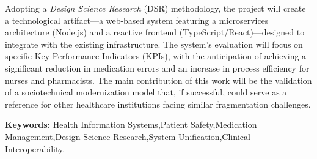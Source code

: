 Adopting a \textit{Design Science Research} (DSR) methodology, the project will create a technological artifact---a web-based system featuring a microservices architecture (Node.js) and a reactive frontend (TypeScript/\-React)---designed to integrate with the existing infrastructure. The system's evaluation will focus on specific Key Performance Indicators (KPIs), with the anticipation of achieving a significant reduction in medication errors and an increase in process efficiency for nurses and pharmacists. The main contribution of this work will be the validation of a socio\-technical modernization model that, if successful, could serve as a reference for other healthcare institutions facing similar fragmentation challenges.

\vspace{6mm}
\noindent\textbf{Keywords:} Health Information Systems,\allowbreak Patient Safety,\allowbreak Medication Management,\allowbreak Design Science Research,\allowbreak System Unification,\allowbreak Clinical Interoperability.
\endgroup 
